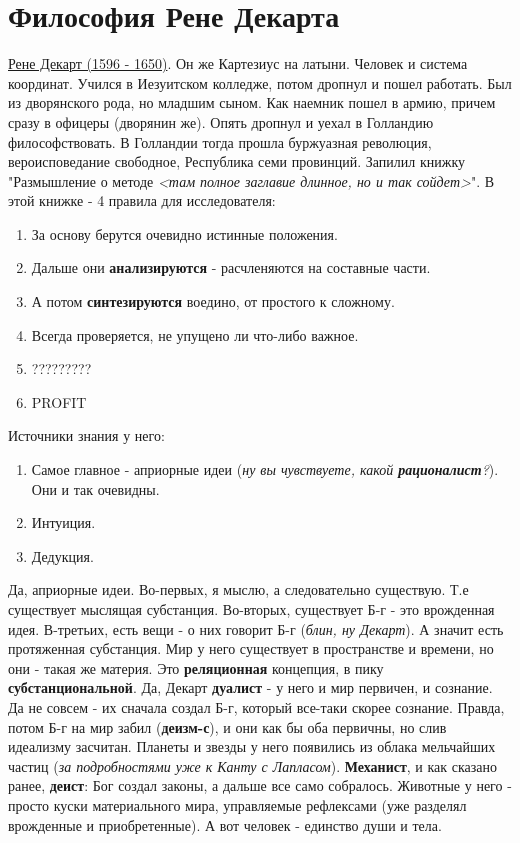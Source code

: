 \section{Философия Рене Декарта}
\underline{Рене Декарт (1596 - 1650)}. Он же Картезиус на латыни. Человек и система координат. Учился в Иезуитском колледже, потом дропнул и пошел работать. Был из дворянского рода, но младшим сыном. Как наемник пошел в армию, причем сразу в офицеры (дворянин же). Опять дропнул и уехал в Голландию философствовать. В Голландии тогда прошла буржуазная революция, вероисповедание свободное, Республика семи провинций. Запилил книжку "Размышление о методе \textit{<там полное заглавие длинное, но и так сойдет>}". В этой книжке - 4 правила для исследователя:
\begin{enumerate}
\item За основу берутся очевидно истинные положения.
\item Дальше они \textbf{анализируются} - расчленяются на составные части.
\item А потом \textbf{синтезируются} воедино, от простого к сложному.
\item Всегда проверяется, не упущено ли что-либо важное.
\item ?????????
\item PROFIT
\end{enumerate}
Источники знания у него:
\begin{enumerate}
\item Самое главное - априорные идеи (\textit{ну вы чувствуете, какой \textbf{рационалист}?}). Они и так очевидны.
\item Интуиция.
\item Дедукция.
\end{enumerate}
Да, априорные идеи. Во-первых, я мыслю, а следовательно существую. Т.е существует мыслящая субстанция.
Во-вторых, существует Б-г - это врожденная идея. В-третьих, есть вещи - о них говорит Б-г (\textit{блин, ну Декарт}). А значит есть протяженная субстанция. Мир у него существует в пространстве и времени, но они - такая же материя. Это \textbf{реляционная} концепция, в пику \textbf{субстанциональной}. Да, Декарт \textbf{дуалист} - у него и мир первичен, и сознание. Да не совсем - их сначала создал Б-г, который все-таки скорее сознание. Правда, потом Б-г на мир забил (\textbf{деизм-с}), и они как бы оба первичны, но слив идеализму засчитан. Планеты и звезды у него появились из облака мельчайших частиц (\textit{за подробностями уже к Канту с Лапласом}). \textbf{Механист}, и как сказано ранее, \textbf{деист}: Бог создал законы, а дальше все само собралось. Животные у него - просто куски материального мира, управляемые рефлексами (уже разделял врожденные и приобретенные). А вот человек - единство души и тела.

